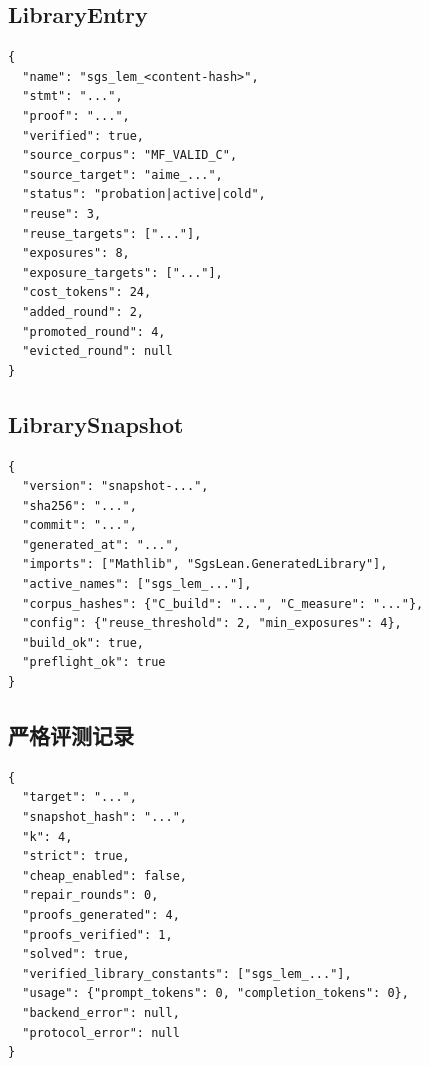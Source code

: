\documentclass[UTF8,a4paper,11pt,fontset=windows]{ctexart}
\begin{document}
\subsection{LibraryEntry}

\begin{verbatim}
{
  "name": "sgs_lem_<content-hash>",
  "stmt": "...",
  "proof": "...",
  "verified": true,
  "source_corpus": "MF_VALID_C",
  "source_target": "aime_...",
  "status": "probation|active|cold",
  "reuse": 3,
  "reuse_targets": ["..."],
  "exposures": 8,
  "exposure_targets": ["..."],
  "cost_tokens": 24,
  "added_round": 2,
  "promoted_round": 4,
  "evicted_round": null
}
\end{verbatim}

\subsection{LibrarySnapshot}

\begin{verbatim}
{
  "version": "snapshot-...",
  "sha256": "...",
  "commit": "...",
  "generated_at": "...",
  "imports": ["Mathlib", "SgsLean.GeneratedLibrary"],
  "active_names": ["sgs_lem_..."],
  "corpus_hashes": {"C_build": "...", "C_measure": "..."},
  "config": {"reuse_threshold": 2, "min_exposures": 4},
  "build_ok": true,
  "preflight_ok": true
}
\end{verbatim}

\subsection{严格评测记录}

\begin{verbatim}
{
  "target": "...",
  "snapshot_hash": "...",
  "k": 4,
  "strict": true,
  "cheap_enabled": false,
  "repair_rounds": 0,
  "proofs_generated": 4,
  "proofs_verified": 1,
  "solved": true,
  "verified_library_constants": ["sgs_lem_..."],
  "usage": {"prompt_tokens": 0, "completion_tokens": 0},
  "backend_error": null,
  "protocol_error": null
}
\end{verbatim}
\end{document}
